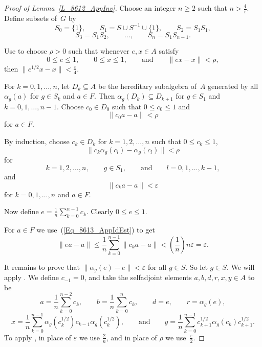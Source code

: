 \documentclass[11pt]{amsart}
\theoremstyle{plain}
\theoremstyle{definition}
\theoremstyle{remark}
\numberwithin{equation}{section}
\newcommand{\rh}{\rho}
\newcommand{\andeqn}{\qquad {\mbox{and}} \qquad}
\begin{document}
\begin{proof}[Proof of Lemma~\ref{L_8612_AppInv}]
Choose an integer $n\geq 2$ such that $n > \frac{4}{\varepsilon}$.
Define subsets of~$G$ by
\[
S_0 = \{ 1 \},
\qquad
S_1 = S \cup S^{-1} \cup \{ 1 \},
\qquad
S_2 = S_1 S_1,
\]
\[
S_3 = S_1 S_2,
\qquad
\ldots,
\qquad
S_n = S_1 S_{n - 1}.
\]

Use
\cite[Lemma 4.4]{AP16}
to choose
$\rh > 0$ such that
whenever $e, x \in A$ satisfy
\[
0 \leq e \leq 1,
\qquad
0 \leq x \leq 1,
\andeqn
\| e x - x \| < \rh,
\]
then $\big\| e^{1/2} x - x \big\| < \frac{\varepsilon}{4}$.

For $k = 0, 1, \ldots, n$,
let $D_k \subseteq A$ be the hereditary
subalgebra of~$A$ generated by all $\alpha_g (a)$
for $g \in S_k$ and $a \in F$.
Then $\alpha_g (D_k) \subseteq D_{k + 1}$
for $g \in S_1$ and $k = 0, 1, \ldots, n - 1$.
Choose $c_0 \in D_0$
such that $0 \leq c_0 \leq 1$ and
%
\begin{equation}\label{Eq_8613_AppId0}
\| c_0 a - a \| < \rh
\end{equation}
%
for $a \in F$.

By induction, choose
$c_k \in D_k$ for $k = 1, 2, \ldots, n$
such that $0 \leq c_k \leq 1$,
%
\begin{equation}\label{Eq_8613_AppIdk}
\| c_k \alpha_g (c_l) - \alpha_g (c_l) \| < \rh
\end{equation}
%
for
\[
k = 1, 2, \ldots, n,
\qquad
g \in S_1,
\andeqn
l = 0, 1, \ldots, k - 1,
\]
and
%
\begin{equation}\label{Eq_8613_AppIdEst}
\| c_k a - a \| < \varepsilon
\end{equation}
%
for $k = 0, 1, \ldots, n$
and $a \in F$.

Now define
$e = \frac{1}{n} \sum_{k = 0}^{n - 1} c_k$.
Clearly $0 \leq e \leq 1$.

For $a \in F$ we use~(\ref{Eq_8613_AppIdEst})
to get
\[
\| e a - a \|
 \leq \frac{1}{n} \sum_{k = 0}^{n - 1} \| c_k a - a \|
 < \left( \frac{1}{n} \right) n \varepsilon
 = \varepsilon.
\]

It remains to prove that $\| \alpha_g (e) - e \| < \varepsilon$
for all $g \in S$.
So let $g \in S$.
We will apply \cite[Lemma 4.3]{AP16}.
We define $c_{-1} = 0$,
and take the selfadjoint elements $a, b, d, r, x, y \in A$
to be
\[
a = \frac{1}{n} \sum_{k = 0}^{n - 2} c_k,
\qquad
b = \frac{1}{n} \sum_{k = 0}^{n} c_k,
\qquad
d = e,
\qquad
r = \alpha_g (e),
\]
\[
x = \frac{1}{n} \sum_{k = 0}^{n - 1}
          \alpha_g ( c_k^{1/2} )  c_{k - 1} \alpha_g ( c_k^{1/2} ),
\andeqn
y = \frac{1}{n} \sum_{k = 0}^{n - 1}
          c_{k + 1}^{1/2} \alpha_g ( c_k ) c_{k + 1}^{1/2}.
\]
To apply  \cite[Lemma 4.3]{AP16}, in place of 
 $\varepsilon$ we use $\frac{2}{n}$,
and in place of $\rh$ we use~$\frac{\varepsilon}{2}$.


\end{proof}
\end{document}

